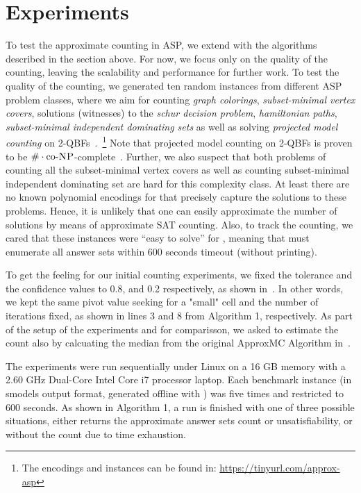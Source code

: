 \section{Experiments} \label{sec:experiments}

To test the approximate counting in ASP, we extend \xorro{} with the algorithms described in the section above.
For now, we focus only on the quality of the counting, leaving the scalability and performance for further work.
%
To test the quality of the counting,
we generated ten random instances from different ASP problem classes, where we aim for counting \emph{graph colorings}, \emph{subset-minimal vertex covers}, solutions (witnesses) to the \emph{schur decision problem}, \emph{hamiltonian paths}, \emph{subset-minimal independent dominating sets} as well as solving \emph{projected model counting} on 2-QBFs~\cite{DurandHermannKolaitis05,KleineBuningLettman99}.~\footnote{The encodings and instances can be found in: \url{https://tinyurl.com/approx-asp}}
Note that projected model counting on 2-QBFs is proven to be $\#\cdot\text{co-}\textsc{NP}$-complete~\cite{DurandHermannKolaitis05}. Further, we also suspect that both problems of counting all the subset-minimal vertex covers as well as counting subset-minimal independent dominating set are hard for this complexity class. At least there are no known polynomial encodings for \SAT that precisely capture the solutions to these problems. Hence, it is unlikely that one can easily approximate the number of solutions by means of approximate SAT counting.
Also, to track the counting, we cared that these instances were ``easy to solve'' for \clasp{},
meaning that \clasp{} must enumerate all answer sets within 600 seconds timeout (without printing).

To get the feeling for our initial counting experiments, we fixed the tolerance and the confidence values to 0.8, and 0.2 respectively, as shown in~\cite{ChakrabortyMV13}.
In other words, we kept the same pivot value seeking for a "small" cell and the number of iterations fixed, as shown in lines 3 and 8 from Algorithm 1, respectively.
As part of the setup of the experiments and for comparisson, we asked \xorro{} to estimate the count also by calcuating the median from the original ApproxMC Algorithm in~\cite{ChakrabortyMV13}.

The experiments were run sequentially under Linux on a 16 GB memory with a 2.60 GHz Dual-Core Intel Core i7 processor laptop.
Each benchmark instance (in smodels output format, generated offline with \gringo{}) was five times and restricted to 600 seconds.
As shown in Algorithm 1, a run is finished with one of three possible situations, either \xorro{} returns the approximate answer sets count or unsatisfiability, or without the count due to time exhaustion.

